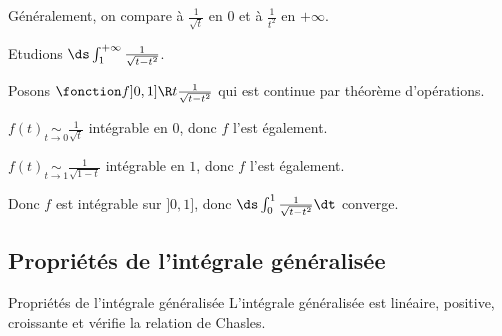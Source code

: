 \begin{remarque}
    Généralement, on compare à $\frac 1 {\sqrt t}$ en $0$ et à $\frac 1 {t^2}$ en $+ \infty$.
\end{remarque}

\begin{exemple}
    Etudions $\ds \int_{1 }^{+\infty} \frac 1 { \sqrt{t - t^2}}$. 

    Posons $\fonction f {]0, 1]}{\R}{t}{\frac{1}{\sqrt{t - t^2}}}$ qui est continue par théorème d'opérations.


    \svspace $f(t) \underset{t \to 0 }{ \sim } \frac 1 {\sqrt t}$ intégrable en $0$, donc $f$ l'est également. 
    

    \svspace $f(t) \underset{t \to 1 }{ \sim } \frac 1 {\sqrt{1 - t}}$ intégrable en $1$, donc $f$ l'est également.

    \avspace Donc $f$ est intégrable sur $]0, 1]$, donc $\ds \int_{0}^{1 } \frac{1}{\sqrt{t - t^2}} \dt$ converge.
\end{exemple}

\subsection{Propriétés de l'intégrale généralisée }

\begin{proposition}{Propriétés de l'intégrale généralisée}{}
    L'intégrale généralisée est linéaire, positive, croissante et vérifie la relation 
    de Chasles. 
\end{proposition}

